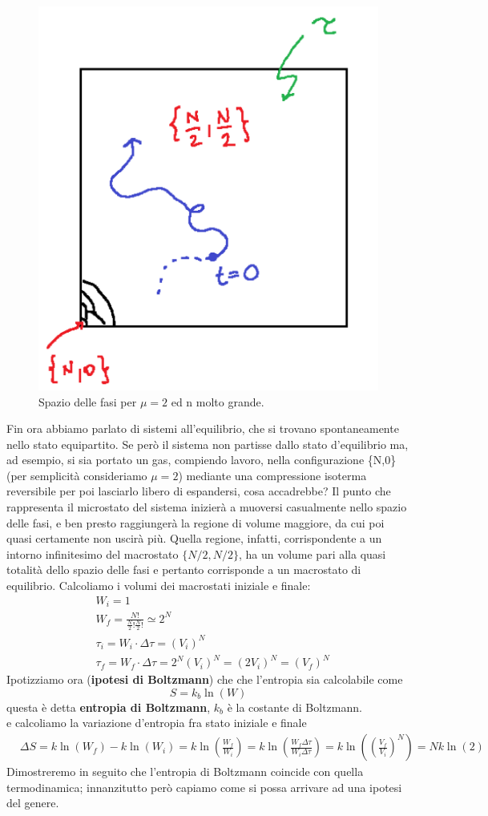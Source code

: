 \documentclass[
10pt, %
a4paper, %
oneside, %
headinclude,footinclude, %
BCOR5mm, %
]{scrartcl}
\begin{document}
\begin{figure}[h!]
	\centering
	\includegraphics[width=0.4\linewidth]{"../images/Spazio delle fasi"}
	\caption{Spazio delle fasi per $\mu = 2$ ed n molto grande.}
	\label{fig:spazio-delle-fasi}
\end{figure}
\FloatBarrier
Fin ora abbiamo parlato di sistemi all'equilibrio, che si trovano spontaneamente nello stato equipartito. Se però il sistema non partisse dallo stato d'equilibrio ma, ad esempio, si sia portato un gas, compiendo lavoro, nella configurazione \{N,0\} (per semplicità consideriamo $\mu=2$) mediante una compressione isoterma reversibile per poi lasciarlo libero di espandersi, cosa accadrebbe? Il punto che rappresenta il microstato del sistema inizierà a muoversi casualmente nello spazio delle fasi, e ben presto raggiungerà la regione di volume maggiore, da cui poi quasi certamente non uscirà più. Quella regione, infatti, corrispondente a un intorno infinitesimo del macrostato \(\{N/2, N/2\}\), ha un volume pari alla quasi totalità dello spazio delle fasi e pertanto corrisponde a un macrostato di equilibrio. Calcoliamo i volumi dei macrostati iniziale e finale:
\begin{align*}
	&W_i = 1\\
	&W_f = \frac{N!}{\frac{N}{2}!\frac{N}{2}!}\simeq2^N\\
	&\tau_i = W_i\cdot\Delta\tau = (V_i)^N \\
	&\tau_f = W_f\cdot\Delta\tau = 2^N(V_i)^N=(2 V_i)^N = (V_f)^N
\end{align*}
Ipotizziamo ora (\textbf{ipotesi di Boltzmann}) che che l'entropia sia calcolabile come
\[S=k_b\ln(W)\]
questa è detta \textbf{entropia di Boltzmann}, \(k_b\) è la costante di Boltzmann.\\
e calcoliamo la variazione d'entropia fra stato iniziale e finale
\begin{align*}
	&\Delta S = k\ln(W_{f})-k\ln(W_{i})=k\ln\left(\frac{W_f}{W_i}\right)=k\ln\left(\frac{W_f\Delta\tau}{W_i\Delta\tau}\right)=k\ln\left(\left(\frac{V_f}{V_i}\right)^N\right)=Nk\ln(2)
\end{align*}
Dimostreremo in seguito che l'entropia di Boltzmann coincide con quella termodinamica; innanzitutto però capiamo come si possa arrivare ad una ipotesi del genere.\\
\end{document}

